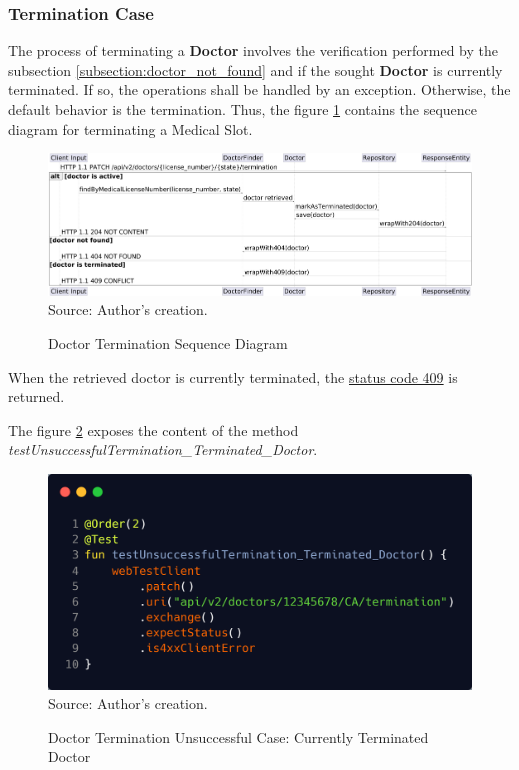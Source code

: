 \subsubsection{Termination Case}
\label{subsection:doctor_termination}

The process of terminating a \textbf{Doctor} involves the verification performed by the subsection \ref{subsection:doctor_not_found} and if the sought \textbf{Doctor} is currently terminated. If so, the operations shall be handled by an exception. Otherwise, the default behavior is the termination. Thus, the figure \ref{fig:doctor_termination_sequence_diagram} contains the sequence diagram for terminating a Medical Slot.

\begin{figure}[H]
	\centering
	\caption{Doctor Termination Sequence Diagram}
	\includegraphics[width=1\linewidth]{figures/doctor_termination_sequence_diagram.png}
	\\ \footnotesize Source: Author's creation.
	\label{fig:doctor_termination_sequence_diagram}
\end{figure}

When the retrieved doctor is currently terminated, the \hyperref[appendix:glossary]{status code 409} is returned. 

The figure \ref{fig:doctor_termination_unsuccessful_integration_test_terminated_doctor} exposes the content of the method \textit{testUnsuccessfulTermination\_Terminated\_Doctor}.

\begin{figure}[H]
	\centering
	\caption{Doctor Termination Unsuccessful Case: Currently Terminated Doctor}
	\includegraphics[width=1\linewidth]{figures/doctor_termination_unsuccessful_integration_test_terminated_doctor.png}
	\\ \footnotesize Source: Author's creation.
	\label{fig:doctor_termination_unsuccessful_integration_test_terminated_doctor}
\end{figure}

